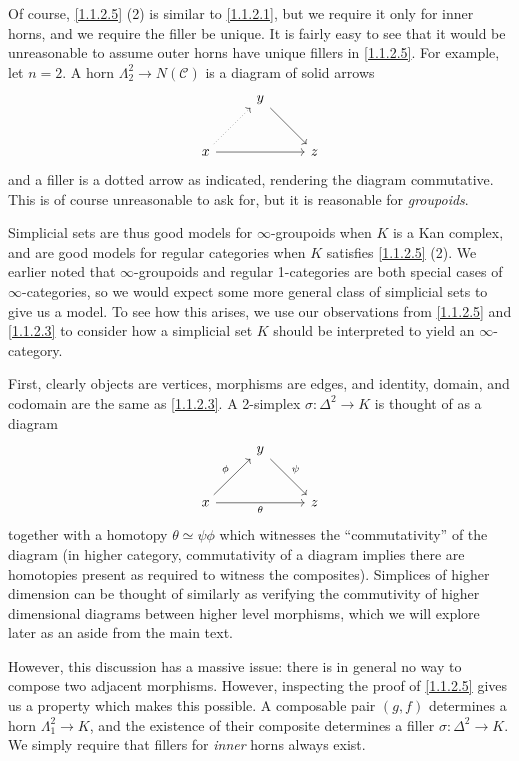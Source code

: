 \begin{remark}\label{1.1.2.7}
	Of course, \cref{1.1.2.5} (2) is similar to \cref{1.1.2.1}, but we require it only for inner horns, and we require the filler be unique. It is fairly easy to see that it would be unreasonable to assume outer horns have unique fillers in \cref{1.1.2.5}. For example, let $n=2$. A horn $\Lambda_2^2 \to N(\mathcal{C} )$ is a diagram of solid arrows
	\[\begin{tikzcd}[row sep = 2.5em, column sep = 2.5em]
	 & y \ar[dr]  &  \\
	x\ar[dotted, ur] \ar[rr]  &  & z
	\end{tikzcd}\]
	and a filler is a dotted arrow as indicated, rendering the diagram commutative. This is of course unreasonable to ask for, but it is reasonable for \emph{groupoids}.
\end{remark}

Simplicial sets are thus good models for $\infty$-groupoids when $K$ is a Kan complex, and are good models for regular categories when $K$ satisfies \cref{1.1.2.5} (2). We earlier noted that $\infty $-groupoids and regular 1-categories are both special cases of $\infty $-categories, so we would expect some more general class of simplicial sets to give us a model. To see how this arises, we use our observations from \cref{1.1.2.5} and \cref{1.1.2.3} to consider how a simplicial set $K$ should be interpreted to yield an $\infty $-category.

First, clearly objects are vertices, morphisms are edges, and identity, domain, and codomain are the same as \cref{1.1.2.3}. A 2-simplex $\sigma : \Delta^2 \to K$ is thought of as a diagram
\[\begin{tikzcd}[row sep = 2.5em, column sep = 2.5em]
 & y\ar[" \psi ", dr]  &  \\
x \ar[" \phi ", ur] \ar[" \theta "', rr]  &  & z
\end{tikzcd}\]
together with a homotopy $\theta \simeq\psi\phi$ which witnesses the ``commutativity'' of the diagram (in higher category, commutativity of a diagram implies there are homotopies present as required to witness the composites). Simplices of higher dimension can be thought of similarly as verifying the commutivity of higher dimensional diagrams between higher level morphisms, which we will explore later as an aside from the main text.

However, this discussion has a massive issue: there is in general no way to compose two adjacent morphisms. However, inspecting the proof of \cref{1.1.2.5} gives us a property which makes this possible. A composable pair $(g,f)$ determines a horn $\Lambda_1^2 \to K$, and the existence of their composite determines a filler $\sigma : \Delta^2 \to K$. We simply require that fillers for \emph{inner} horns always exist.

